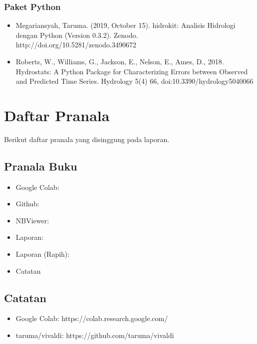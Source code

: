 \documentclass[11pt]{article}
\providecommand{\tightlist}{%
      \setlength{\itemsep}{0pt}\setlength{\parskip}{0pt}}
\begin{document}
\hypertarget{paket-python}{%
\subsubsection{Paket Python}\label{paket-python}}

\begin{itemize}
\tightlist
\item
  Megariansyah, Taruma. (2019, October 15). hidrokit: Analisis Hidrologi
  dengan Python (Version 0.3.2). Zenodo.
  http://doi.org/10.5281/zenodo.3490672
\item
  Roberts, W., Williams, G., Jackson, E., Nelson, E., Ames, D., 2018.
  Hydrostats: A Python Package for Characterizing Errors between
  Observed and Predicted Time Series. Hydrology 5(4) 66,
  doi:10.3390/hydrology5040066
\end{itemize}

    \hypertarget{daftar-pranala}{%
\section{Daftar Pranala}\label{daftar-pranala}}

Berikut daftar pranala yang disinggung pada laporan.

    \hypertarget{pranala-buku}{%
\subsection{Pranala Buku}\label{pranala-buku}}

\begin{itemize}
\tightlist
\item
  Google Colab:
\item
  Github:
\item
  NBViewer:
\item
  Laporan:
\item
  Laporan (Rapih):
\item
  Catatan
\end{itemize}

\hypertarget{catatan}{%
\subsection{Catatan}\label{catatan}}

\begin{itemize}
\tightlist
\item
  Google Colab: https://colab.research.google.com/
\item
  taruma/vivaldi: https://github.com/taruma/vivaldi
\end{itemize}
\end{document}

